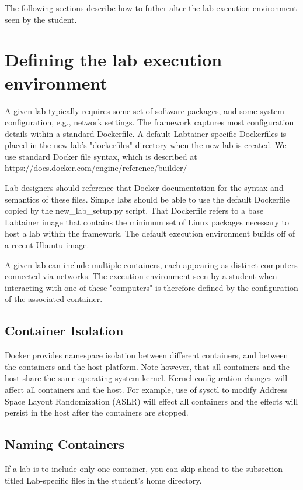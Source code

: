 \documentclass{article}
\begin{document}
The following sections describe how to futher alter the lab execution environment seen by 
the student.

\section {Defining the lab execution environment}
A given lab typically requires some set of software packages, and some
system configuration, e.g., network settings.  
The framework captures most configuration details within a standard
Dockerfile.  A default Labtainer-specific Dockerfiles is placed in the new lab's "dockerfiles" 
directory when the new lab is created.  We use standard Docker file syntax, which is described at 
\url{https://docs.docker.com/engine/reference/builder/}

Lab designers should reference that Docker documentation for the 
syntax and semantics of these files.
Simple labs should be able to use the default Dockerfile copied by the 
new\_lab\_setup.py script.  That Dockerfile refers to a base Labtainer
image that contains the minimum set of Linux packages necessary to 
host a lab within the framework.  The default
execution environment builds off of a recent Ubuntu image.

A given lab can include multiple containers, each appearing as distinct
computers connected via networks.  The execution environment seen by a
student when interacting with one of these "computers" is therefore defined
by the configuration of the associated container.  

\subsection {Container Isolation}
Docker provides namespace isolation between different containers, and
between the containers and the host platform.  Note however, that all
containers and the host share the same operating system kernel.  Kernel
configuration changes will affect all containers and the host.  For example,
use of sysctl to modify Address Space Layout Randomization (ASLR) will effect
all containers and the effects will persist in the host after the containers
are stopped.

\subsection {Naming Containers}
If a lab is to include only one container, you can
skip ahead to the subsection titled Lab-specific files in the student's home directory.
\end{document}
